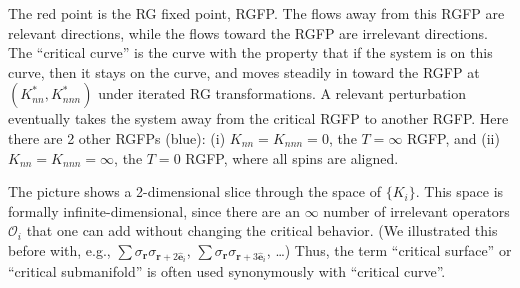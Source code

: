 \begin{diagram}
\label{fig:rgflow}
\end{diagram}

The red point is the RG fixed point, RGFP. The flows away from this RGFP are relevant directions, while
the flows toward the RGFP are irrelevant directions. The ``critical curve'' is the curve with the
property that if the system is on this curve, then it stays on the curve, and moves steadily in toward the
RGFP at $(K_{nn}^*,K_{nnn}^*)$ under iterated RG transformations. A relevant perturbation eventually takes
the system away from the critical RGFP to another RGFP. Here there are 2 other RGFPs (blue): (i)
$K_{nn} = K_{nnn} = 0$, the $T = \infty$ RGFP, and (ii) $K_{nn} = K_{nnn} = \infty$, the $T = 0$ RGFP,
where all spins are aligned.

The picture shows a 2-dimensional slice through the space of $\{K_i\}$. This space is formally
infinite-dimensional, since there are an $\infty$ number of irrelevant operators $\mathcal O_i$ that one
can add without changing the critical behavior. (We illustrated this before with, e.g.,
$\sum\sigma_{\mathbf r}\sigma_{\mathbf r+2\hat{\mathbf e}_i}$,
$\sum\sigma_{\mathbf r}\sigma_{\mathbf r+3\hat{\mathbf e}_i}$, \ldots) Thus, the term ``critical surface''
or ``critical submanifold'' is often used synonymously with ``critical curve''.

